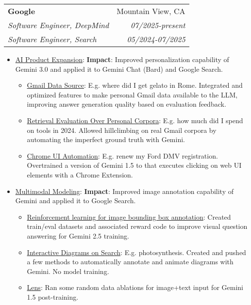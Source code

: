 \documentclass[letterpaper,9pt]{article}
\makeatletter
\newcommand{\resumeItem}[2]{
    \item\small{
        \underline{#1}{: #2 \vspace{-2pt}}
    }
}
\newcommand{\resumeDoubleSubheading}[6]{
    \vspace{-1pt}\item
    \begin{tabular*}{0.97\textwidth}[t]{l@{\extracolsep{\fill}}r}
        \textbf{#1} & #2 \\
        \textit{\small#3} & \textit{\small #4} \\
        \textit{\small#5} & \textit{\small #6} \\
    \end{tabular*}\vspace{-5pt}
}
\newcommand{\resumeItemListStart}{\begin{itemize}}
\newcommand{\resumeItemListEnd}{\end{itemize}\vspace{-5pt}}
\makeatother
\begin{document}
    \resumeDoubleSubheading
      {Google}{Mountain View, CA}
      {Software Engineer, DeepMind}{07/2025-present}
      {Software Engineer, Search}{05/2024-07/2025}
      \resumeItemListStart
        \resumeItem{AI Product Expansion}
          {
              \newline \textbf{Impact}: Improved personalization capability of Gemini 3.0 and applied it to Gemini Chat (Bard) and Google Search.
          }
          \resumeItemListStart
            \resumeItem{Gmail Data Source}{E.g. where did I get gelato in Rome. Integrated and optimized features to make personal Gmail data available to the LLM, improving answer generation quality based on evaluation feedback.}
            \resumeItem{Retrieval Evaluation Over Personal Corpora}{E.g. how much did I spend on tools in 2024. Allowed hillclimbing on real Gmail corpora by automating the imperfect ground truth with Gemini.}
            \resumeItem{Chrome UI Automation}{E.g. renew my Ford DMV registration. Overtrained a version of Gemini 1.5 to that executes clicking on web UI elements with a Chrome Extension.}
          \resumeItemListEnd
          \vspace{4pt}
        \resumeItem{Multimodal Modeling}
          {
              \newline \textbf{Impact}: Improved image annotation capability of Gemini and applied it to Google Search.
          }
          \resumeItemListStart
            \resumeItem{Reinforcement learning for image bounding box annotation}{Created train/eval datasets and associated reward code to improve visual question answering for Gemini 2.5 training.}
            \resumeItem{Interactive Diagrams on Search}{E.g. photosynthesis. Created and pushed a few methods to automatically annotate and animate diagrams with Gemini. No model training.}
            \resumeItem{Lens}{Ran some random data ablations for image+text input for Gemini 1.5 post-training.}
          \resumeItemListEnd
          \vspace{4pt}
      \resumeItemListEnd
\end{document}
